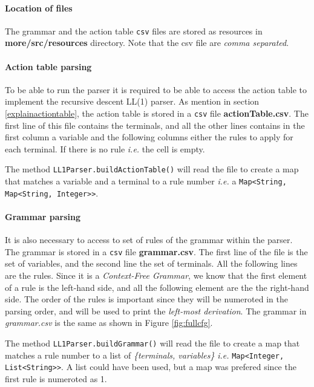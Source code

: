 \documentclass[letterpaper]{article}
\begin{document}
\paragraph{Location of files}
The grammar and the action table \texttt{csv} files are stored
as resources in
\textbf{more/src/resources} directory.
Note that the csv file are \textit{comma separated}.

\paragraph{Action table parsing}
To be able to run the parser it is required to be able to access
the action table to implement
the recursive descent LL(1) parser.
As mention in section \ref{explainactiontable}, the action table is stored
in a \texttt{csv} file \textbf{actionTable.csv}.
The first line of this file contains the
terminals, and all the other lines contains in the first column a variable
and the following columns either the rules to apply for each terminal.
If there is no rule \textit{i.e.} the cell is empty.

The method \texttt{LL1Parser.buildActionTable()} will read the file
to create a map that matches a variable and a terminal to a rule number
\textit{i.e.} a \texttt{Map<String, Map<String, Integer>>}.

\paragraph{Grammar parsing}
It is also necessary to access to set of rules of the grammar within the
parser. The grammar is stored in a \texttt{csv} file \textbf{grammar.csv}.
The first line of the file is the set of variables, and the second line
the set of terminals. All the following lines are the rules.
Since it is a \textit{Context-Free Grammar}, we know that the first element
of a rule is the left-hand side, and all the following element are the
the right-hand side.
The order of the rules is important since they will be numeroted in the parsing
order, and will be used to print the \textit{left-most derivation}.
The grammar in \textit{grammar.csv} is the same as shown in
Figure \ref{fig:fullcfg}.

The method \texttt{LL1Parser.buildGrammar()} will read the file to create
a map that matches a rule number to a list
of \textit{\{terminals, variables\}}
\textit{i.e.} \texttt{Map<Integer, List<String>>}.
A list could have been used, but a map was prefered since the first rule
is numeroted as 1.
\end{document}
